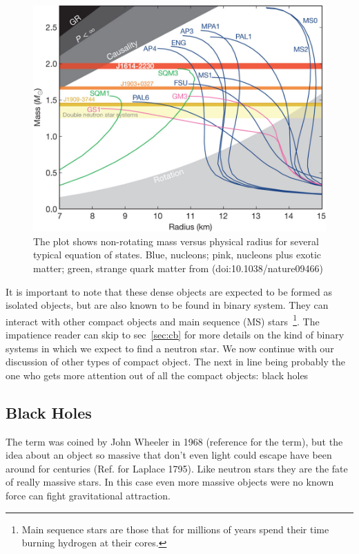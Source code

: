 \begin{figure}[]
        \centering
\includegraphics[scale=.3]{assets/images/es.jpg}
\caption{The plot shows non-rotating mass versus physical radius for several typical equation of states.  Blue, nucleons; pink, nucleons plus exotic matter; green, strange quark matter from (doi:10.1038/nature09466)}
\label{fig:nsmod}
\end{figure}

It is important to note that these dense objects are expected to be formed as isolated objects, but are also known to be found in binary system. They can interact with other compact objects and main sequence (MS) stars~\footnote{Main sequence stars are those that for millions of years spend their time burning hydrogen at their cores.}. The impatience reader can skip to sec~\ref{sec:cb} for more details on the kind of binary systems in which we expect to find a neutron star. We now continue with our discussion of other types of compact object. The next in line being probably the one who gets more attention out of all the compact objects: black holes



\subsection{Black Holes}\label{sec:bh}

The term was coined by John Wheeler in 1968 (reference for the term), but the idea about an object so massive that don't even light could escape have been around for centuries (Ref. for Laplace 1795). Like neutron stars they are the fate of really massive stars. In this case even more massive objects were no known force can fight gravitational attraction. 

